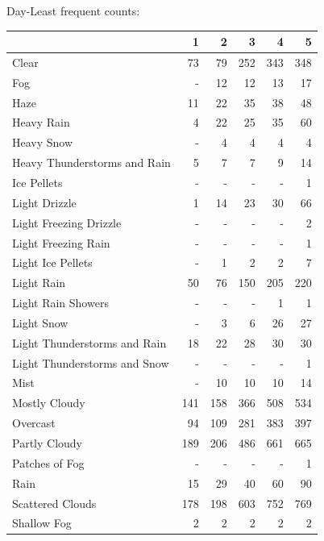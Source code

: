 \documentclass[11pt]{scrartcl}
\begin{document}
Day-Least frequent counts:
\begin{tabular}{lrrrrr}
\toprule
{} &    1 &    2 &    3 &    4 &    5 \\
\midrule
Clear                        &   73 &   79 &  252 &  343 &  348 \\
Fog                          &  - &   12 &   12 &   13 &   17 \\
Haze                         &   11 &   22 &   35 &   38 &   48 \\
Heavy Rain                   &    4 &   22 &   25 &   35 &   60 \\
Heavy Snow                   &  - &    4 &    4 &    4 &    4 \\
Heavy Thunderstorms and Rain &    5 &    7 &    7 &    9 &   14 \\
Ice Pellets                  &  - &  - &  - &  - &    1 \\
Light Drizzle                &    1 &   14 &   23 &   30 &   66 \\
Light Freezing Drizzle       &  - &  - &  - &  - &    2 \\
Light Freezing Rain          &  - &  - &  - &  - &    1 \\
Light Ice Pellets            &  - &    1 &    2 &    2 &    7 \\
Light Rain                   &   50 &   76 &  150 &  205 &  220 \\
Light Rain Showers           &  - &  - &  - &    1 &    1 \\
Light Snow                   &  - &    3 &    6 &   26 &   27 \\
Light Thunderstorms and Rain &   18 &   22 &   28 &   30 &   30 \\
Light Thunderstorms and Snow &  - &  - &  - &  - &    1 \\
Mist                         &  - &   10 &   10 &   10 &   14 \\
Mostly Cloudy                &  141 &  158 &  366 &  508 &  534 \\
Overcast                     &   94 &  109 &  281 &  383 &  397 \\
Partly Cloudy                &  189 &  206 &  486 &  661 &  665 \\
Patches of Fog               &  - &  - &  - &  - &    1 \\
Rain                         &   15 &   29 &   40 &   60 &   90 \\
Scattered Clouds             &  178 &  198 &  603 &  752 &  769 \\
Shallow Fog                  &    2 &    2 &    2 &    2 &    2 \\

\end{tabular}
\end{document}
